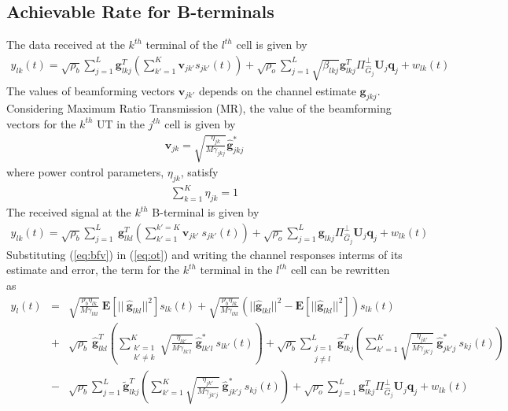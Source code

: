 \documentclass[10pt, a4paper, twoside,fleqn]{article}
\begin{document}
\subsection{Achievable Rate for B-terminals}

The data received at the $k^{th}$ terminal of the $l^{th}$ cell is given by
\begin{eqnarray}\label{eq:ot}
 	y_{lk}(t) = \sqrt{\rho_b}\sum_{j=1}^{L} \pmb{g}_{lkj}^{T} \left(\sum_{k'=1}^{K}\pmb{v}_{jk'}s_{jk'}(t)\right)
 		      + \sqrt{\rho_o}\sum_{j=1}^{L}\sqrt{\beta_{lkj}}\pmb{g}^T_{lkj} \Pi^{\perp}_{{\widehat{G}_j}} \pmb{U}_j\pmb{q}_{j}+ w_{lk}(t)
\end{eqnarray}  
The values of beamforming vectors $\pmb{v}_{jk'}$ depends on the channel estimate $\pmb{g}_{jkj}$. Considering Maximum Ratio Transmission (MR), the value of the beamforming vectors for the $k^{th}$ UT in the $j^{th}$ cell is given by
\begin{eqnarray}\label{eq:bfv}
	\pmb{v}_{jk} = \sqrt{\frac{\eta_{jk}}{M\gamma_{jkj}}}\pmb{\hat g}^*_{jkj}
\end{eqnarray}
where power control parameters, $\eta_{jk}$, satisfy 
\begin{eqnarray}\label{eqn:etaconstraint}
\sum\limits_{k=1}^{K}\eta_{jk}=1
\end{eqnarray}
The received signal at the $k^{th}$ B-terminal is given by
\begin{eqnarray}\label{eqn:rxbt}
    y_{lk}(t) = \sqrt{\rho_b}\sum\limits_{j=1}^{L} \ \pmb{g}_{lkl}^T \left( \sum\limits_{k'=1}^{k'=K}\pmb{v}_{jk'} \ s_{jk'}(t)\right) + \sqrt{\rho_o}\sum_{j=1}^{L}\pmb{g}_{lkj} \Pi^{\perp}_{{\widehat{G}_j}} \pmb{U}_j \pmb{q}_{j}
    + w_{lk}(t) 
\end{eqnarray}
Substituting (\ref{eq:bfv}) in (\ref{eq:ot}) and writing the channel responses interms of its estimate and error, the term for the $k^{th}$ terminal in the $l^{th}$ cell can be rewritten as
\begin{eqnarray} \label{eqn:completeot}
	y_{l}(t)  &=& \sqrt{\frac{\rho_b\eta_{lk}}{M\gamma_{lkl}}} \ \pmb{E}[|| \ \pmb{\hat g}_{lkl}||^2]s_{lk}(t)
	           +  \sqrt{\frac{\rho_b\eta_{lk}}{M\gamma_{lkl}}}\left(||\pmb{\hat g}_{lkl}||^2 - \pmb{E}[||\pmb{\hat g}_{lkl}||^2]\right)s_{lk}(t) \nonumber \\    
               &+& \sqrt{\rho_b} \ \pmb{\hat g}_{lkl}^T \left(\sum_{\substack{k'=1 \\ k' \neq k}}^{K} \sqrt{\frac{\eta_{lk'}}{M\gamma_{lk'l}}} \ \pmb{\hat g}^*_{lk'l} \ s_{lk'} (t)\right) 
               + \sqrt{\rho_b} \sum_{\substack{j=1 \\ j \neq l}}^{L} \pmb{\hat g}_{lkj}^T \left(\sum_{k'=1}^{K} \sqrt{\frac{\eta_{jk'}}{M\gamma_{jk'j}}} \ \pmb{\hat g}^*_{jk'j} \ s_{kj} (t)\right)\nonumber \\
               &-& \sqrt{\rho_b} \sum_{j=1}^{L} \pmb{\widetilde{g}}_{lkj}^T \left(\sum_{k'=1}^{K} \sqrt{\frac{\eta_{jk'}}{M\gamma_{jk'j}}} \ \pmb{\hat g}^*_{jk'j} \ s_{kj} (t)\right) 
               + \sqrt{\rho_o}\sum_{j=1}^{L}\pmb{g}^T_{lkj} \Pi^{\perp}_{{\widehat{G}_j}} \pmb{U}_j \pmb{q}_{j}
               + w_{lk}(t)      
\end{eqnarray}
\end{document}
